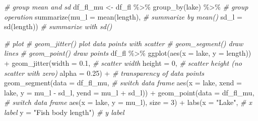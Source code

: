 \documentclass[
]{book}
\newenvironment{Shaded}{\begin{snugshade}}{\end{snugshade}}
\newcommand{\AttributeTok}[1]{\textcolor[rgb]{0.77,0.63,0.00}{#1}}
\newcommand{\CommentTok}[1]{\textcolor[rgb]{0.56,0.35,0.01}{\textit{#1}}}
\newcommand{\DecValTok}[1]{\textcolor[rgb]{0.00,0.00,0.81}{#1}}
\newcommand{\FloatTok}[1]{\textcolor[rgb]{0.00,0.00,0.81}{#1}}
\newcommand{\FunctionTok}[1]{\textcolor[rgb]{0.00,0.00,0.00}{#1}}
\newcommand{\NormalTok}[1]{#1}
\newcommand{\OtherTok}[1]{\textcolor[rgb]{0.56,0.35,0.01}{#1}}
\newcommand{\SpecialCharTok}[1]{\textcolor[rgb]{0.00,0.00,0.00}{#1}}
\newcommand{\StringTok}[1]{\textcolor[rgb]{0.31,0.60,0.02}{#1}}
\begin{document}
\begin{Shaded}
\begin{Highlighting}[]
\CommentTok{\# group mean and sd}
\NormalTok{df\_fl\_mu }\OtherTok{\textless{}{-}}\NormalTok{ df\_fl }\SpecialCharTok{\%\textgreater{}\%} 
  \FunctionTok{group\_by}\NormalTok{(lake) }\SpecialCharTok{\%\textgreater{}\%} \CommentTok{\# group operation}
  \FunctionTok{summarize}\NormalTok{(}\AttributeTok{mu\_l =} \FunctionTok{mean}\NormalTok{(length), }\CommentTok{\# summarize by mean()}
            \AttributeTok{sd\_l =} \FunctionTok{sd}\NormalTok{(length)) }\CommentTok{\# summarize with sd()}

\CommentTok{\# plot}
\CommentTok{\# geom\_jitter() plot data points with scatter}
\CommentTok{\# geom\_segment() draw lines}
\CommentTok{\# geom\_point() draw points}
\NormalTok{df\_fl }\SpecialCharTok{\%\textgreater{}\%} 
  \FunctionTok{ggplot}\NormalTok{(}\FunctionTok{aes}\NormalTok{(}\AttributeTok{x =}\NormalTok{ lake,}
             \AttributeTok{y =}\NormalTok{ length)) }\SpecialCharTok{+}
  \FunctionTok{geom\_jitter}\NormalTok{(}\AttributeTok{width =} \FloatTok{0.1}\NormalTok{, }\CommentTok{\# scatter width}
              \AttributeTok{height =} \DecValTok{0}\NormalTok{, }\CommentTok{\# scatter height (no scatter with zero)}
              \AttributeTok{alpha =} \FloatTok{0.25}\NormalTok{) }\SpecialCharTok{+} \CommentTok{\# transparency of data points}
  \FunctionTok{geom\_segment}\NormalTok{(}\AttributeTok{data =}\NormalTok{ df\_fl\_mu, }\CommentTok{\# switch data frame}
               \FunctionTok{aes}\NormalTok{(}\AttributeTok{x =}\NormalTok{ lake,}
                   \AttributeTok{xend =}\NormalTok{ lake,}
                   \AttributeTok{y =}\NormalTok{ mu\_l }\SpecialCharTok{{-}}\NormalTok{ sd\_l,}
                   \AttributeTok{yend =}\NormalTok{ mu\_l }\SpecialCharTok{+}\NormalTok{ sd\_l)) }\SpecialCharTok{+}
  \FunctionTok{geom\_point}\NormalTok{(}\AttributeTok{data =}\NormalTok{ df\_fl\_mu, }\CommentTok{\# switch data frame}
             \FunctionTok{aes}\NormalTok{(}\AttributeTok{x =}\NormalTok{ lake,}
                 \AttributeTok{y =}\NormalTok{ mu\_l),}
             \AttributeTok{size =} \DecValTok{3}\NormalTok{) }\SpecialCharTok{+}
  \FunctionTok{labs}\NormalTok{(}\AttributeTok{x =} \StringTok{"Lake"}\NormalTok{, }\CommentTok{\# x label}
       \AttributeTok{y =} \StringTok{"Fish body length"}\NormalTok{) }\CommentTok{\# y label}
\end{Highlighting}
\end{Shaded}
\end{document}
